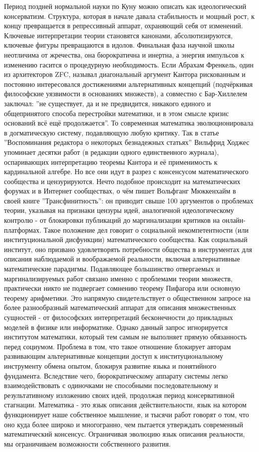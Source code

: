 \documentclass[12pt]{article}
\begin{document}
Период поздней нормальной науки по Куну можно описать как идеологический консерватизм. Структура, которая в начале давала стабильность и мощный рост, к концу превращается в репрессивный аппарат, охраняющий себя от изменений. Ключевые интерпретации теории становятся канонами, абсолютизируются, ключевые фигуры превращаются в идолов. Финальная фаза научной школы неотличима от жречества, она бюрократична и инертна, а энергия импульсов к изменению гасится о процедурную необходимость. Если Абрахам Френкель, один из архитекторов ZFC, называл диагональный аргумент Кантора рискованным и постоянно интересовался достижениями альтернативных концепций (подчёркивая философские уязвимости в основаниях множеств), а совместно с Бар-Хиллелем заключал: ''не существует, да и не предвидится, никакого единого и общепринятого способа перестройки математики, и в этом смысле кризис оснований всё ещё продолжается''. То современная математика эволюционировала в догматическую систему, подавляющую любую критику. Так в статье ''Воспоминания редактора о некоторых безнадежных статьях'' Вильфрид Ходжес упоминает десятки работ (в редакции одного единственного журнала), оспаривающих интерпретацию теоремы Кантора и её применимость к кардинальной алгебре. Но все они идут в разрез с консенсусом математического сообщества и цензурируются. Нечто подобное происходит на математических форумах и в Интернет сообществах, о чём пишет Вольфганг Мюккенхайм в своей книге ''Трансфинитность'': он приводит свыше 100 аргументов о проблемах теории, указывая на признаки цензуры идей, аналогичной идеологическому контролю - от блокировки публикаций до маргинализации критиков на онлайн-платформах. Такое положение дел говорит о социальной некомпетентности (или институциональной дисфункции) математического сообщества. Как социальный институт, оно призвано удовлетворять потребности общества в инструментах для описания наблюдаемой и воображаемой реальности, включая альтернативные математические парадигмы. Подавляющее большинство отвергаемых и маргинализируемых работ связано именно с проблемами теории множеств, практически никто не подвергает сомнению теорему Пифагора или основную теорему арифметики. Это напрямую свидетельствует о общественном запросе на более разнообразный математический аппарат для описания множественных сущностей - от философских интерпретаций бесконечности до прикладных моделей в физике или информатике. Однако данный запрос игнорируется институтом математики, который тем самым не выполняет прямую обязанность перед социумом. Проблема в том, что такое отношение блокирует авторам развивающим альтернативные концепции доступ к институциональному инструменту обмена опытом, блокируя развитие языка и понятийного фундамента. Вследствие чего, бюрократическому аппарату системы легко взаимодействовать с одиночками не способными последовательному и результативному изложению своих идей, продолжая период консервативной стагнации. Математика - это язык описания действительности, язык на котором функционирует наше собственное мышление, и тысячи работ говорят о том, что оно куда более широко и многогранно, чем пытается утверждать современный математический консенсус. Ограничивая эволюцию язык описания реальности, мы ограничиваем возможности собственного развития. 
\end{document}
